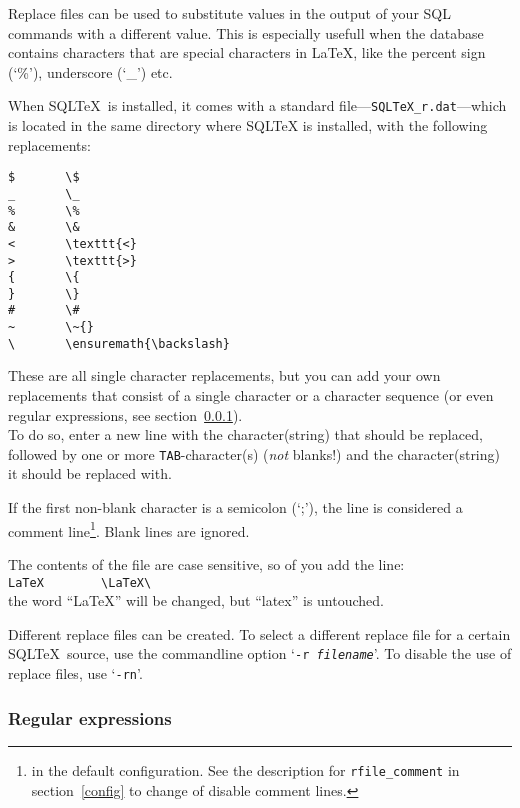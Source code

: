 \documentclass{article}
\begin{document}
Replace files can be used to substitute values in the output of your SQL commands with a different value. This is especially usefull when the database
contains characters that are special characters in \LaTeX, like the percent sign (`\%'), underscore (`\_') etc.

When SQL\TeX\ is installed, it comes with a standard file---\texttt{SQLTeX\_r.dat}---which is located in the same directory where SQLTeX is installed,
with the following replacements:

\vspace{3mm}

\noindent\begin{verbatim}
$       \$
_       \_
%       \%
&       \&
<       \texttt{<}
>       \texttt{>}
{       \{
}       \}
#       \#
~       \~{}
\       \ensuremath{\backslash}
\end{verbatim}

\vspace{3mm}

These are all single character replacements, but you can add your own replacements that consist of a single character or a character sequence (or even regular expressions, see section~\ref{regexp}).\\
To do so, enter a new line with the character(string) that should be replaced, followed by one or more \texttt{TAB}-character(s) (\textit{not} blanks!) and the character(string) it should be replaced with.

If the first non-blank character is a semicolon (`;'), the line is considered a comment line\footnote{ in the default configuration. See the description for \texttt{rfile\_comment} in section~\ref{config} to change of disable comment lines.}. Blank lines are ignored.

\vspace{3mm}

The contents of the file are case sensitive, so of you add the line: \\
\verb+LaTeX        \LaTeX\+ \\
the word ``LaTeX'' will be changed, but ``latex'' is untouched.

\vspace{3mm}

Different replace files can be created. To select a different replace file for a certain SQL\TeX\ source, use the commandline option
`\texttt{-r \textit{filename}}'. To disable the use of replace files, use `\texttt{-rn}'.

\subsubsection{Regular expressions}\label{regexp}
\end{document}
